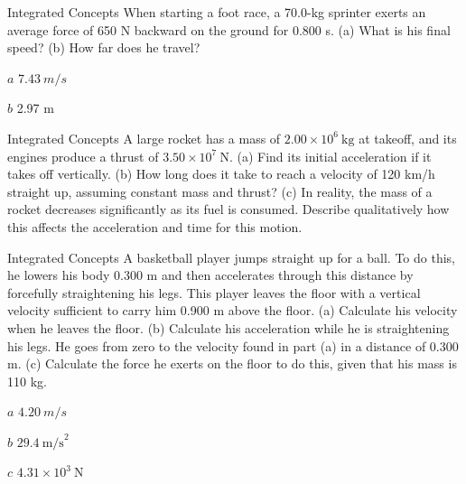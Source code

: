\documentclass[
]{book}
\newenvironment{problems-exercises}{}{}
\newenvironment{tinysection}{}{}
\begin{document}
\begin{problems-exercises}
\begin{tinysection}
{Integrated Concepts} When starting a foot race, a
70.0-kg sprinter exerts an average force of 650 N backward on the ground
for 0.800 s. (a) What is his final speed? (b) How far does he travel?

\end{tinysection}

\leavevmode\hypertarget{fs-id1930138}{}%
\(a\) \(7.43\ m/s{}\)

\(b\) 2.97 m

\hypertarget{fs-id2441621}{}
\hypertarget{fs-id1446886}{}
\begin{tinysection}

{Integrated Concepts} A large rocket has a mass of
\({2\text{.}{\text{00} \times \text{10}^{6}}\ \text{kg}}{}\) at takeoff,
and its engines produce a thrust of
\({3\text{.}{\text{50} \times \text{10}^{7}}\ \text{N}}{}\). (a) Find its
initial acceleration if it takes off vertically. (b) How long does it
take to reach a velocity of 120 km/h straight up, assuming constant mass
and thrust? (c) In reality, the mass of a rocket decreases significantly
as its fuel is consumed. Describe qualitatively how this affects the
acceleration and time for this motion.

\end{tinysection}

\hypertarget{fs-id3065143}{}
\hypertarget{fs-id3065145}{}
\begin{tinysection}

{Integrated Concepts} A basketball player jumps
straight up for a ball. To do this, he lowers his body 0.300 m and then
accelerates through this distance by forcefully straightening his legs.
This player leaves the floor with a vertical velocity sufficient to
carry him 0.900 m above the floor. (a) Calculate his velocity when he
leaves the floor. (b) Calculate his acceleration while he is
straightening his legs. He goes from zero to the velocity found in part
(a) in a distance of 0.300 m. (c) Calculate the force he exerts on the
floor to do this, given that his mass is 110 kg.

\end{tinysection}

\leavevmode\hypertarget{fs-id3109737}{}%
\(a\) \(4.20\ m/s{}\)

\(b\) \({\text{29.4}\ \text{m/s}^{2}}{}\)

\(c\) \({4\text{.}{\text{31} \times \text{10}^{3}}\ \text{N}}{}\)

\hypertarget{fs-id3178018}{}
\hypertarget{fs-id2991158}{}
\begin{tinysection}


\end{tinysection}
\end{problems-exercises}
\end{document}

